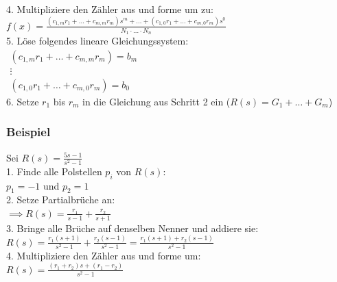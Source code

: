 \documentclass[10pt,a4paper]{article}
\begin{document}
4. Multipliziere den Zähler aus und forme um zu: \\
$ f(x) = \frac{(c_{1,m}r_1 + \dots + c_{m,m}r_m)s^m + \dots + (c_{1,0}r_1 + \dots + c_{m,0}r_m)s^0}{N_1 ⋅ \dots ⋅ N_n}$ \\

5. Löse folgendes lineare Gleichungssystem: \\
$\begin{array}{c}
(c_{1,m}r_1 + \dots + c_{m,m}r_m) = b_m \\
\vdots \\
(c_{1,0}r_1 + \dots + c_{m,0}r_m) = b_0
\end{array}$ \\

6. Setze $r_1$ bis $r_m$ in die Gleichung aus Schritt 2 ein ($R(s) = G_1 + \dots + G_m$)

%
%

\subsubsection{Beispiel}
Sei $R(s) = \frac{5s-1}{s^2-1}$ \\

1. Finde alle Polstellen $p_i$ von $R(s):$ \\
$p_1 = -1$ und $p_2 = 1$ \\

2. Setze Partialbrüche an: \\
$\implies R(s) = \frac {r_1} {s - 1} + \frac {r_2} {s + 1}$ \\

3. Bringe alle Brüche auf denselben Nenner und addiere sie: \\
$R(s) = \frac{r_1(s + 1)}{s^2-1} + \frac{r_2(s - 1)}{s^2-1} = \frac{r_1(s + 1) + r_2(s - 1)}{s^2-1}$\\

4. Multipliziere den Zähler aus und forme um: \\
$ R(s) = \frac{(r_1 + r_2)s + (r_1 - r_2)}{s^2-1}$ \\
\end{document}
